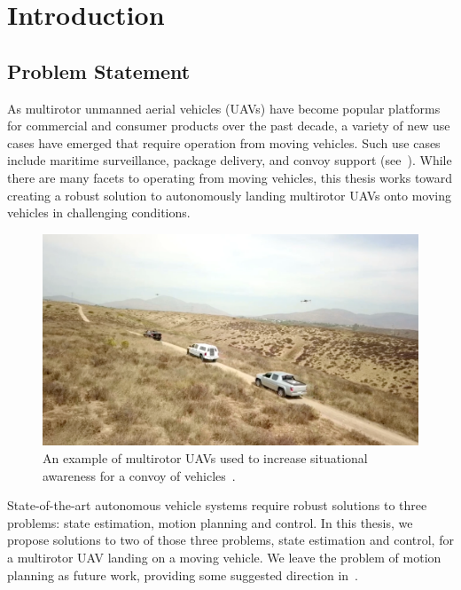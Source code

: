 
\chapter{Introduction}
\label{chp:introduction}

\section{Problem Statement}
As multirotor unmanned aerial vehicles (UAVs) have become popular
platforms for commercial and consumer products over the past decade, a variety
of new use cases have emerged that require operation from moving vehicles.
Such use cases include
maritime surveillance, package delivery, and convoy
support (see~). While there are
many facets to operating from moving vehicles, this thesis works toward creating
a robust solution to autonomously landing multirotor UAVs onto moving vehicles
in challenging conditions.

\begin{figure}[t]
  \centering
  \includegraphics[width=5.5in]{figures/drone_convoy_support.png}
  \caption[UAV Convoy Support]{An example of multirotor UAVs used to increase
  situational awareness for a convoy of
vehicles~\cite{ground_vehicle_based_drones}.}
%
  \label{fig:drone_convoy_support}
\end{figure}

State-of-the-art autonomous vehicle systems require robust solutions to three
problems: state estimation, motion planning and control. In this thesis,
we propose solutions to two of those three problems, state estimation and
control, for a multirotor UAV landing on a moving vehicle. We leave the problem
of motion planning as future work, providing some suggested direction
in~.

